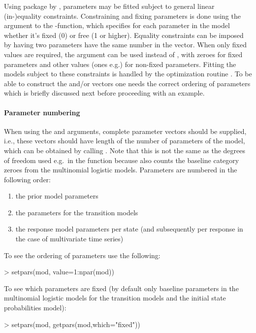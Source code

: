 \documentclass[article]{jss}
\begin{document}
Using package  by \citet{Tamura2009}, parameters may be fitted subject to
general linear (in-)equality constraints.  Constraining and fixing
parameters is done using the  argument to the
-function, which specifies for each parameter in the
model whether it's fixed (0) or free (1 or higher).  Equality
constraints can be imposed by having two parameters have the same
number in the  vector.  When only fixed values are
required, the  argument can be used instead of
, with zeroes for fixed parameters and other values (ones
e.g.) for non-fixed parameters.  Fitting the models subject to these
constraints is handled by the optimization routine .
To be able to construct the  and/or  vectors 
one needs the correct ordering of parameters which is briefly discussed 
next before proceeding with an example. 

\paragraph{Parameter numbering} When using the  and
 arguments, complete parameter vectors should be supplied,
i.e., these vectors should have length of the number of parameters of
the model, which can be obtained by calling . Note that
this is not the same as the degrees of freedom used e.g.\ in the 
function because  also counts the baseline category zeroes
from the multinomial logistic models. 
Parameters are numbered in the following order:
\begin{enumerate}
	\item  the prior model parameters
	\item  the parameters for the transition models
	\item  the response model parameters per state (and subsequently
	per response in the case of multivariate time series)
\end{enumerate}

To see the ordering of parameters use the following:
\begin{CodeChunk}
\begin{CodeInput}
> setpars(mod, value=1:npar(mod))
\end{CodeInput}
\end{CodeChunk}

To see which parameters are fixed (by default only baseline parameters
in the multinomial logistic models for the transition models and the
initial state probabilities model):
\begin{CodeChunk}
\begin{CodeInput}
> setpars(mod, getpars(mod,which="fixed"))
\end{CodeInput}
\end{CodeChunk}
\end{document}
